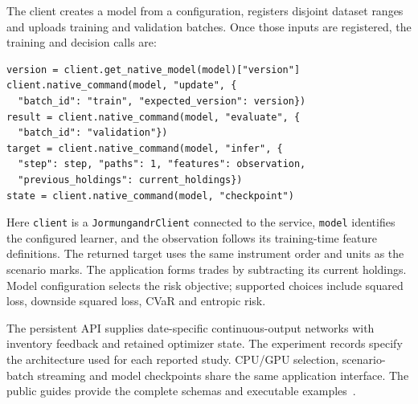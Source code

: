 \documentclass[8pt]{strategynet-journal}
\begin{document}
\begin{SNcolumns}
The client creates a model from a configuration, registers disjoint dataset
ranges and uploads training and validation batches. Once those inputs are
registered, the training and decision calls are:
\par\noindent
\begin{minipage}{\linewidth}
\begin{lstlisting}[basicstyle=\ttfamily\normalsize,columns=fullflexible,breaklines=true,frame=single,framesep=3pt]
version = client.get_native_model(model)["version"]
client.native_command(model, "update", {
  "batch_id": "train", "expected_version": version})
result = client.native_command(model, "evaluate", {
  "batch_id": "validation"})
target = client.native_command(model, "infer", {
  "step": step, "paths": 1, "features": observation,
  "previous_holdings": current_holdings})
state = client.native_command(model, "checkpoint")
\end{lstlisting}
\end{minipage}
\par
Here \texttt{client} is a \texttt{JormungandrClient} connected to the service,
\texttt{model} identifies the configured learner, and the observation follows
its training-time feature definitions. The returned target uses the same
instrument order and units as the scenario marks. The application forms trades
by subtracting its current holdings. Model configuration selects the risk
objective; supported choices include squared loss, downside squared loss,
CVaR and entropic risk.

The persistent API supplies date-specific continuous-output networks with
inventory feedback and retained optimizer state. The experiment records
specify the architecture used for each reported study. CPU/GPU selection,
scenario-batch streaming and model checkpoints share the same application
interface. The public guides provide the complete schemas and executable
examples~\cite{nativevolt,nativejorm}.
\end{SNcolumns}
\end{document}

